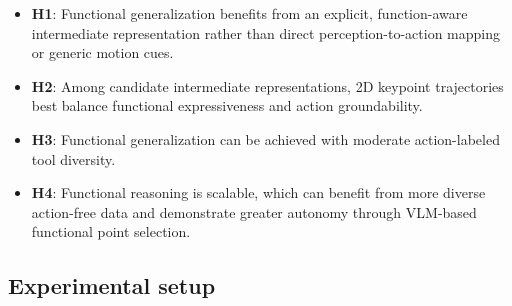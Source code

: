 \begin{itemize}[leftmargin=*]
    \item \textbf{H1}: Functional generalization benefits from an explicit, function-aware intermediate representation rather than direct perception-to-action mapping or generic motion cues.
    \item \textbf{H2}: Among candidate intermediate representations, 2D keypoint trajectories best balance functional expressiveness and action groundability.
    
    \item \textbf{H3}: Functional generalization can be achieved with moderate action-labeled tool diversity.
    
    \item \textbf{H4}: Functional reasoning is scalable, which can benefit from more diverse action-free data and demonstrate greater autonomy through VLM-based functional point selection.
\end{itemize}


\subsection{Experimental setup}
\label{sec:experiments_setup}

